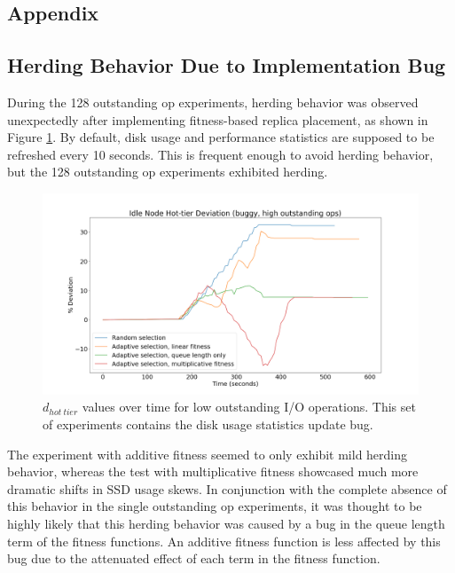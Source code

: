 \documentclass[12pt]{article}
\begin{document}
\newpage
\FloatBarrier
\begin{appendices}
\appendix
\section{Appendix}

  \subsection{Herding Behavior Due to Implementation Bug}

  During the 128 outstanding op experiments, herding behavior
  was observed unexpectedly after implementing fitness-based replica placement,
  as shown in Figure \ref{fig:herding_bug}. By default, disk usage and
  performance statistics are supposed to be refreshed every 10 seconds. This is
  frequent enough to avoid herding behavior, but the 128 outstanding op
  experiments exhibited herding.

  \begin{figure}[htbp]
    \centering
    \includegraphics[scale=0.30]{images/buggy.png} 
    \caption{$d_{hot\ tier}$ values over time for low outstanding I/O
             operations. This set of experiments contains the disk usage statistics update bug.}
    \label{fig:herding_bug}
  \end{figure}

  The experiment with additive fitness seemed to only exhibit mild herding
  behavior, whereas the test with multiplicative fitness showcased much more
  dramatic shifts in SSD usage skews. In conjunction with the complete absence
  of this behavior in the single outstanding op experiments, it was thought to
  be highly likely that this herding behavior was caused by a bug in the queue
  length term of the fitness functions. An additive fitness function is less
  affected by this bug due to the attenuated effect of each term in the fitness
  function.


\end{appendices}
\end{document}
